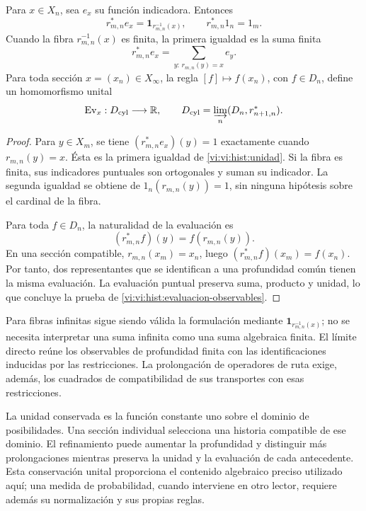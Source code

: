 \begin{lemma}
Para \(x\in X_n\), sea \(e_x\) su función indicadora. Entonces
\begin{equation}
 r_{m,n}^*e_x=\mathbf1_{r_{m,n}^{-1}(x)},\qquad
 r_{m,n}^*1_n=1_m.
 \label{vi:vi:hist:unidad}
\end{equation}
Cuando la fibra \(r_{m,n}^{-1}(x)\) es finita, la primera igualdad es
la suma finita
\[
 r_{m,n}^*e_x=\sum_{y:\,r_{m,n}(y)=x}e_y.
\]
Para toda sección \(x=(x_n)\in X_\infty\), la regla
\([f]\mapsto f(x_n)\), con \(f\in D_n\), define un homomorfismo
unital
\begin{equation}
 \operatorname{Ev}_x:D_{\mathrm{cyl}}\longrightarrow\mathbb R,
 \qquad
 D_{\mathrm{cyl}}=\varinjlim_n(D_n,r_{n+1,n}^*).
 \label{vi:vi:hist:evaluacion-observables}
\end{equation}
\end{lemma}
\begin{proof}
Para \(y\in X_m\), se tiene
\((r_{m,n}^*e_x)(y)=1\) exactamente cuando \(r_{m,n}(y)=x\).
Ésta es la primera igualdad de \eqref{vi:vi:hist:unidad}. Si la fibra es
finita, sus indicadores puntuales son ortogonales y suman su indicador.
La segunda igualdad se obtiene de \(1_n(r_{m,n}(y))=1\), sin ninguna
hipótesis sobre el cardinal de la fibra.

Para toda \(f\in D_n\), la naturalidad de la evaluación es
\[
 (r_{m,n}^*f)(y)=f(r_{m,n}(y)).
\]
En una sección compatible, \(r_{m,n}(x_m)=x_n\), luego
\((r_{m,n}^*f)(x_m)=f(x_n)\). Por tanto, dos representantes que se
identifican a una profundidad común tienen la misma evaluación.
La evaluación puntual preserva suma, producto y unidad, lo que concluye
la prueba de \eqref{vi:vi:hist:evaluacion-observables}.
\end{proof}

Para fibras infinitas sigue siendo válida la formulación mediante
\(\mathbf1_{r_{m,n}^{-1}(x)}\); no se necesita interpretar una suma
infinita como una suma algebraica finita. El límite directo reúne los
observables de profundidad finita con las identificaciones inducidas por
las restricciones. La prolongación de operadores de ruta exige, además,
los cuadrados de compatibilidad de sus transportes con esas restricciones.

La unidad conservada es la función constante uno sobre el dominio de
posibilidades. Una sección individual selecciona una historia compatible
de ese dominio. El refinamiento puede aumentar la profundidad y distinguir
más prolongaciones mientras preserva la unidad y la evaluación de cada
antecedente. Esta conservación unital proporciona el contenido algebraico
preciso utilizado aquí; una medida de probabilidad, cuando interviene en
otro lector, requiere además su normalización y sus propias reglas.
